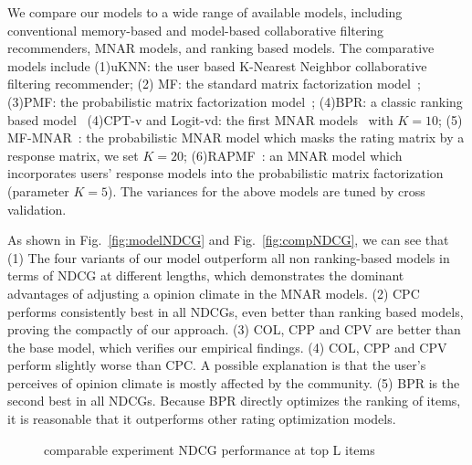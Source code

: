 \documentclass[sigconf]{acmart}
\begin{document}
We compare our models to a wide range of available models, including conventional memory-based and model-based collaborative filtering recommenders, MNAR models, and ranking based models. The comparative models include (1)uKNN: the user based K-Nearest Neighbor collaborative filtering recommender; (2) MF: the standard matrix factorization model~\cite{Koren2009Matrix}; (3)PMF: the probabilistic matrix factorization model~\cite{salakhutdinov2008probabilistic}; (4)BPR: a classic ranking based model~\cite{Rendle2009BPR} (4)CPT-v and Logit-vd: the first MNAR models~\cite{Marlin2009Collaborative} with $K=10$; (5) MF-MNAR~\cite{Hernandez-Lobato2014Probabilistic}: the probabilistic MNAR model which masks the rating matrix by a response matrix, we set $K=20$; (6)RAPMF~\cite{Yang2015Boosting}: an MNAR model which incorporates users' response models into the probabilistic matrix factorization (parameter $K=5$). The variances for the above models are tuned by cross validation.

As shown in Fig.~\ref{fig:modelNDCG} and Fig.~\ref{fig:compNDCG}, we can see that (1) The four variants of our model outperform all non ranking-based models in terms of NDCG at different lengths, which demonstrates the dominant advantages of adjusting a opinion climate in the MNAR models.  (2) CPC performs consistently best in all NDCGs, even better than ranking based models, proving the compactly of our approach. (3) COL, CPP and CPV are better than the base model, which verifies our empirical findings. (4) COL, CPP and CPV perform slightly worse than CPC. A possible explanation is that the user's perceives of opinion climate is mostly affected by the community. (5) BPR is the second best in all NDCGs. Because BPR directly optimizes the ranking of items, it is reasonable that it outperforms other rating optimization models.  


\begin{figure}[!htbp]
\centering
{}
\vspace{-1em}
\caption{comparable experiment NDCG performance at top L items}
\end{figure}
\end{document}
